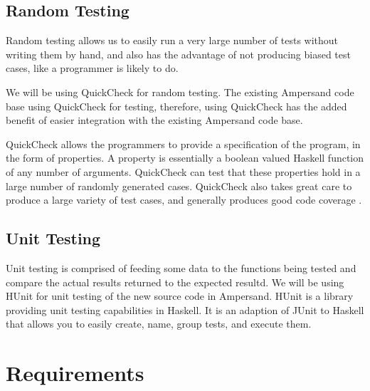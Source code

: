 \documentclass[12pt]{report}
\begin{document}
\subsection{Random Testing}\label{subsec:RandTest}
Random testing allows us to easily run a very large number of tests without
writing them by hand, and also has the advantage of not producing biased test
cases, like a programmer is likely to do.

We will be using QuickCheck \cite{hackage} for random testing. The existing 
Ampersand code base
using QuickCheck for testing, therefore, using QuickCheck has the added benefit
of easier integration with the existing Ampersand code base.

QuickCheck allows the programmers to provide a specification of the program, in
the form of properties. A property is essentially a boolean valued Haskell
function of any number of arguments. QuickCheck can test that these properties
hold in a large number of randomly generated cases. QuickCheck also takes great
care to produce a large variety of test cases, and generally produces good code
coverage \cite{hackage}.



\subsection{Unit Testing}\label{subsec:UnitTest}
Unit testing is comprised of feeding some data to the functions being tested and
compare the actual results returned to the expected resultd.
We will be using HUnit for unit testing of the new source code in Ampersand. HUnit is a library providing unit
testing capabilities in Haskell.  It is an adaption of JUnit to Haskell that
allows you to easily create, name, group tests, and execute them.

\section{Requirements}\label{sec:Reqs}
\end{document}
